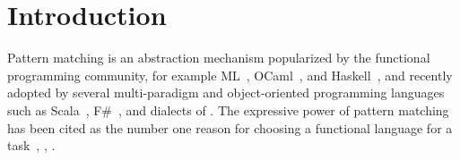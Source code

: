 \section{Introduction} %
\label{sec:intro}


Pattern matching is an abstraction mechanism popularized by the functional
programming community, for example ML~\cite{ML78},
OCaml~\cite{OPM01}, and Haskell~\cite{haskell90},
and recently adopted by several multi-paradigm and object-oriented programming 
languages such as Scala~\cite{Scala2nd}, F\#~\cite{Syme07}, 
 and dialects of 
\Cpp{}\cite{Prop96,App}.
The expressive power of pattern matching has been cited as the number one reason for choosing a functional language for a 
task~\cite{FramaC09}, \cite{Minsky08}, \cite{Nanavati08}.

